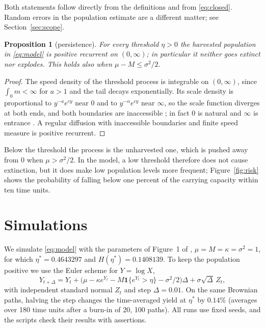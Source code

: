 \documentclass[11pt]{article}
\newtheorem{proposition}[theorem]{Proposition}
\theoremstyle{definition}
\begin{document}
Both statements follow directly from the definitions and from \eqref{eq:closed}. Random errors in the population
estimate are a different matter; see Section~\ref{sec:scope}.

\begin{proposition}[persistence]\label{prop:persist}
For every threshold $\eta > 0$ the harvested population in \eqref{eq:model} is positive recurrent on
$(0,\infty)$; in particular it neither goes extinct nor explodes. This holds also when $\mu - M \le \sigma^2/2$.
\end{proposition}

\begin{proof}
The speed density of the threshold process is integrable on $(0,\infty)$, since $\int_0 m < \infty$ for $a > 1$
and the tail decays exponentially. Its scale density is proportional to $y^{-a}e^{cy}$ near $0$ and to
$y^{-\alpha}e^{cy}$ near $\infty$, so the scale function diverges at both ends, and both boundaries are
inaccessible \cite[Chapter~15]{karlin81}; in fact $0$ is natural and $\infty$ is entrance
\cite[Section~4]{hening19}. A regular diffusion with inaccessible boundaries and finite speed
measure is positive recurrent.
\end{proof}

Below the threshold the process is the unharvested one, which is pushed away from $0$ when $\mu > \sigma^2/2$.
In the model, a low threshold therefore does not cause extinction, but it does make low population levels
more frequent; Figure~\ref{fig:risk} shows the probability of falling below one percent of the carrying capacity
within ten time units.

\section{Simulations}\label{sec:numerics}

We simulate \eqref{eq:model} with the parameters of Figure~1 of \cite{hening19}, $\mu = M = \kappa = \sigma^2 = 1$,
for which $\eta^* = 0.4643297$ and $H(\eta^*) = 0.1408139$. To keep the population positive we use the Euler
scheme for $Y = \log X$,
\[
  Y_{t+\Delta} = Y_t + \bigl(\mu - \kappa e^{Y_t} - M\mathbf 1\{e^{Y_t} > \eta\} - \sigma^2/2\bigr)\Delta
  + \sigma\sqrt{\Delta}\,Z_t ,
\]
with independent standard normal $Z_t$ and step $\Delta = 0.01$. On the same Brownian paths, halving the step
changes the time-averaged yield at $\eta^*$ by $0.14\%$ (averages over 180 time units after a burn-in of 20,
100 paths). All runs use fixed seeds,
and the scripts check their results with assertions.
\end{document}
